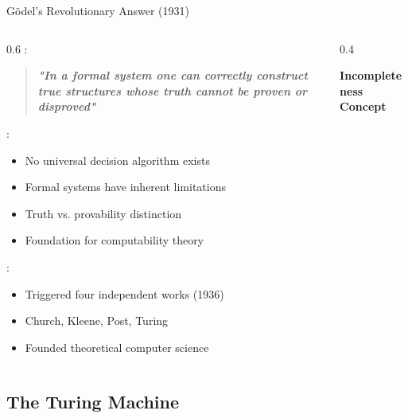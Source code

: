 \begin{frame}{Gödel's Revolutionary Answer (1931)}
\begin{columns}
\begin{column}{0.6\textwidth}
:
\begin{quote}
\textbf{\textit{"In a formal system one can correctly construct true structures whose truth cannot be proven or disproved"}}
\end{quote}

\vspace{0.3cm}
:
\begin{itemize}
\item No universal decision algorithm exists
\item Formal systems have inherent limitations
\item Truth vs. provability distinction
\item Foundation for computability theory
\end{itemize}

\vspace{0.3cm}
:
\begin{itemize}
\item Triggered four independent works (1936)
\item Church, Kleene, Post, Turing
\item Founded theoretical computer science
\end{itemize}
\end{column}
\begin{column}{0.4\textwidth}
\begin{center}
\textbf{Incompleteness Concept}
\vspace{0.3cm}

\end{center}
\end{column}
\end{columns}
\end{frame}

\subsection{The Turing Machine}


